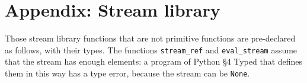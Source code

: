 \section*{Appendix: Stream library}

Those stream library functions that are not primitive functions are
pre-declared as follows, with their types. The functions \lstinline{stream_ref} and
\lstinline{eval_stream} assume that the stream has enough elements: a program of Python \S 4 Typed
that defines them in this way has a type error, because the stream can be \lstinline{None}.


